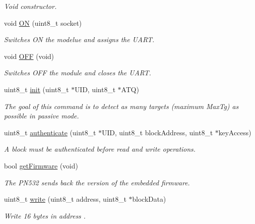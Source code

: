 \begin{DoxyCompactItemize}
\begin{DoxyCompactList}\small\item\em Void constructor. \end{DoxyCompactList}\item 
void \hyperlink{class_wasp_r_f_i_d_adf55287533563cc52fb2d3d4a7a6709b}{ON} (uint8\+\_\+t socket)
\begin{DoxyCompactList}\small\item\em Switches ON the modelue and assigns the U\+A\+RT. \end{DoxyCompactList}\item 
void \hyperlink{class_wasp_r_f_i_d_aa951b5e2f0a12e64ad4d880c7e2bff46}{O\+FF} (void)
\begin{DoxyCompactList}\small\item\em Switches O\+FF the module and closes the U\+A\+RT. \end{DoxyCompactList}\item 
uint8\+\_\+t \hyperlink{class_wasp_r_f_i_d_a72bfa6ae640df908fcad7d13e3214b34}{init} (uint8\+\_\+t $\ast$U\+ID, uint8\+\_\+t $\ast$A\+TQ)
\begin{DoxyCompactList}\small\item\em The goal of this command is to detect as many targets (maximum Max\+Tg) as possible in passive mode. \end{DoxyCompactList}\item 
uint8\+\_\+t \hyperlink{class_wasp_r_f_i_d_acb0ff073a455c3b1d480c16e0218ff86}{authenticate} (uint8\+\_\+t $\ast$U\+ID, uint8\+\_\+t block\+Address, uint8\+\_\+t $\ast$key\+Access)
\begin{DoxyCompactList}\small\item\em A block must be authenticated before read and write operations. \end{DoxyCompactList}\item 
bool \hyperlink{class_wasp_r_f_i_d_adc446ba6d9cdb9512d42bc6d9b742c81}{get\+Firmware} (void)
\begin{DoxyCompactList}\small\item\em The P\+N532 sends back the version of the embedded firmware. \end{DoxyCompactList}\item 
uint8\+\_\+t \hyperlink{class_wasp_r_f_i_d_a5e0b4dc84ba20cb8a374fd15e1843574}{write} (uint8\+\_\+t address, uint8\+\_\+t $\ast$block\+Data)
\begin{DoxyCompactList}\small\item\em Write 16 bytes in address . \end{DoxyCompactList}\item 

\end{DoxyCompactItemize}
